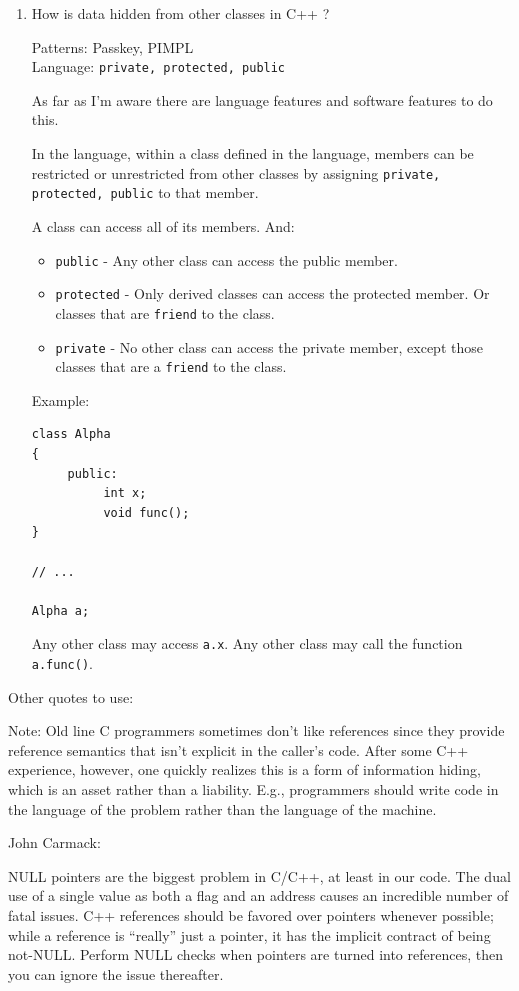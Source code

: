 \documentclass[12pt]{article}
\begin{document}
\begin{enumerate}
\begin{enumerate}
  \end{enumerate}


\item How is data hidden from other classes in C++ ?

Patterns: Passkey, PIMPL\\
Language: {\texttt{private, protected, public}} \\
\par


As far as I'm aware there are language features and software features
to do this.

In the language, within a class defined in the language, members can be
restricted or unrestricted from other classes by assigning
 {\texttt{private, protected, public}} to that member.

A class can access all of its members.  And:

\begin{itemize}
\item {\texttt{public}} - Any other class can access the public member.
\item {\texttt{protected}} - Only derived classes can access the protected member. Or classes that are {\texttt{friend}} to the class.
\item {\texttt{private}} - No other class can access the private member,
except those classes that are a {\texttt{friend}} to the class.
\end{itemize}


Example:
\begin{lstlisting}
class Alpha
{
     public:
          int x;
          void func();
}

// ...

Alpha a;

\end{lstlisting}

Any other class may access {\texttt{a.x}}.  Any other class
may call the function {\texttt{a.func()}}.  




\end{enumerate} 


Other quotes to  use:

Note: Old line C programmers sometimes don't like references since they provide reference semantics that isn't explicit in the caller's code. After some C++ experience, however, one quickly realizes this is a form of information hiding, which is an asset rather than a liability. E.g., programmers should write code in the language of the problem rather than the language of the machine.


John Carmack:

NULL pointers are the biggest problem in C/C++, at least in our code. The dual use of a single value as both a flag and an address causes an incredible number of fatal issues. C++ references should be favored over pointers whenever possible; while a reference is “really” just a pointer, it has the implicit contract of being not-NULL. Perform NULL checks when pointers are turned into references, then you can ignore the issue thereafter.
\end{document}
